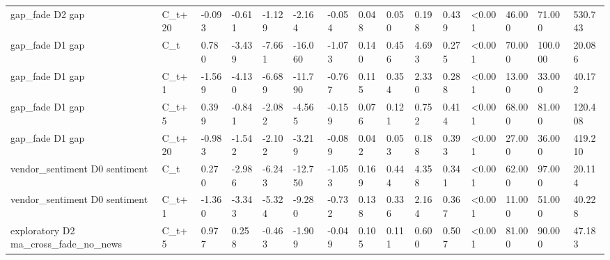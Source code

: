 \begin{tabular}{lllllllllllllll}
gap\_fade D2 gap & C\_t+20 & -0.093 & -0.611 & -1.129 & -2.164 & -0.054 & 0.048 & 0.050 & 0.198 & 0.439 & <0.001 & 46.000 & 71.000 & 530.743 \\
gap\_fade D1 gap & C\_t & 0.780 & -3.439 & -7.661 & -16.060 & -1.073 & 0.140 & 0.456 & 4.693 & 0.275 & <0.001 & 70.000 & 100.000 & 20.086 \\
gap\_fade D1 gap & C\_t+1 & -1.569 & -4.130 & -6.689 & -11.790 & -0.767 & 0.115 & 0.354 & 2.330 & 0.288 & <0.001 & 13.000 & 33.000 & 40.172 \\
gap\_fade D1 gap & C\_t+5 & 0.399 & -0.841 & -2.082 & -4.565 & -0.159 & 0.076 & 0.121 & 0.752 & 0.414 & <0.001 & 68.000 & 81.000 & 120.408 \\
gap\_fade D1 gap & C\_t+20 & -0.983 & -1.542 & -2.102 & -3.219 & -0.089 & 0.042 & 0.053 & 0.188 & 0.393 & <0.001 & 27.000 & 36.000 & 419.210 \\
vendor\_sentiment D0 sentiment & C\_t & 0.270 & -2.986 & -6.243 & -12.750 & -1.053 & 0.169 & 0.444 & 4.358 & 0.341 & <0.001 & 62.000 & 97.000 & 20.114 \\
vendor\_sentiment D0 sentiment & C\_t+1 & -1.360 & -3.343 & -5.324 & -9.280 & -0.732 & 0.138 & 0.336 & 2.164 & 0.367 & <0.001 & 11.000 & 51.000 & 40.228 \\
exploratory D2 ma\_cross\_fade\_no\_news & C\_t+5 & 0.977 & 0.258 & -0.463 & -1.909 & -0.049 & 0.105 & 0.111 & 0.600 & 0.507 & <0.001 & 81.000 & 90.000 & 47.183 \\
\bottomrule
\end{tabular}

